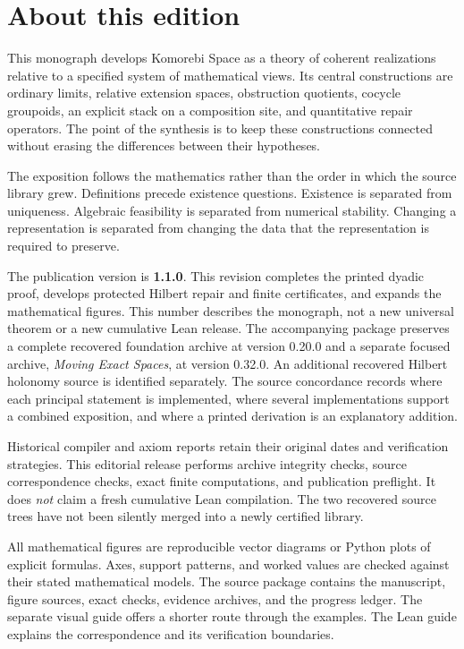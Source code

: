 \documentclass[11pt]{article}
\begin{document}
\KomorebiCover
{}
\section*{About this edition}
This monograph develops Komorebi Space as a theory of coherent realizations relative to a specified system of mathematical views. Its central constructions are ordinary limits, relative extension spaces, obstruction quotients, cocycle groupoids, an explicit stack on a composition site, and quantitative repair operators. The point of the synthesis is to keep these constructions connected without erasing the differences between their hypotheses.

The exposition follows the mathematics rather than the order in which the source library grew. Definitions precede existence questions. Existence is separated from uniqueness. Algebraic feasibility is separated from numerical stability. Changing a representation is separated from changing the data that the representation is required to preserve.

The publication version is \textbf{1.1.0}. This revision completes the printed dyadic proof, develops protected Hilbert repair and finite certificates, and expands the mathematical figures. This number describes the monograph, not a new universal theorem or a new cumulative Lean release. The accompanying package preserves a complete recovered foundation archive at version 0.20.0 and a separate focused archive, \emph{Moving Exact Spaces}, at version 0.32.0. An additional recovered Hilbert holonomy source is identified separately. The source concordance records where each principal statement is implemented, where several implementations support a combined exposition, and where a printed derivation is an explanatory addition.

Historical compiler and axiom reports retain their original dates and verification strategies. This editorial release performs archive integrity checks, source correspondence checks, exact finite computations, and publication preflight. It does \emph{not} claim a fresh cumulative Lean compilation. The two recovered source trees have not been silently merged into a newly certified library.

All mathematical figures are reproducible vector diagrams or Python plots of explicit formulas. Axes, support patterns, and worked values are checked against their stated mathematical models. The source package contains the manuscript, figure sources, exact checks, evidence archives, and the progress ledger. The separate visual guide offers a shorter route through the examples. The Lean guide explains the correspondence and its verification boundaries.
\end{document}
